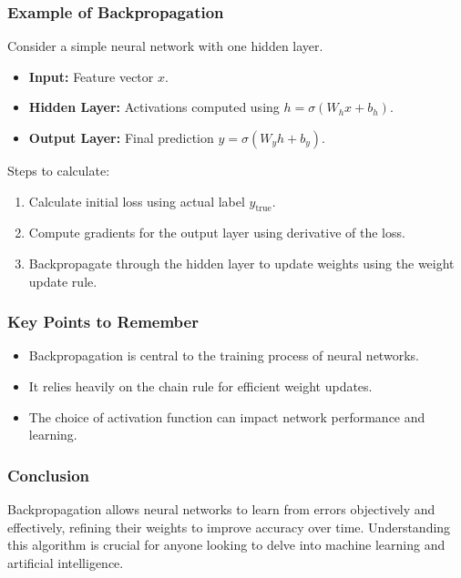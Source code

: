 \documentclass[aspectratio=169]{beamer}
\begin{document}
\begin{frame}[fragile]
    \frametitle{Example of Backpropagation}
    Consider a simple neural network with one hidden layer.
    \begin{itemize}
        \item \textbf{Input:} Feature vector \( x \).
        \item \textbf{Hidden Layer:} Activations computed using \( h = \sigma(W_h x + b_h) \).
        \item \textbf{Output Layer:} Final prediction \( y = \sigma(W_y h + b_y) \).
    \end{itemize}
    
    Steps to calculate:
    \begin{enumerate}
        \item Calculate initial loss using actual label \( y_{\text{true}} \).
        \item Compute gradients for the output layer using derivative of the loss.
        \item Backpropagate through the hidden layer to update weights using the weight update rule.
    \end{enumerate}
\end{frame}

\begin{frame}[fragile]
    \frametitle{Key Points to Remember}
    \begin{itemize}
        \item Backpropagation is central to the training process of neural networks.
        \item It relies heavily on the chain rule for efficient weight updates.
        \item The choice of activation function can impact network performance and learning.
    \end{itemize}
\end{frame}

\begin{frame}[fragile]
    \frametitle{Conclusion}
    Backpropagation allows neural networks to learn from errors objectively and effectively, refining their weights to 
    improve accuracy over time. Understanding this algorithm is crucial for anyone looking to delve into machine 
    learning and artificial intelligence.
\end{frame}
\end{document}
